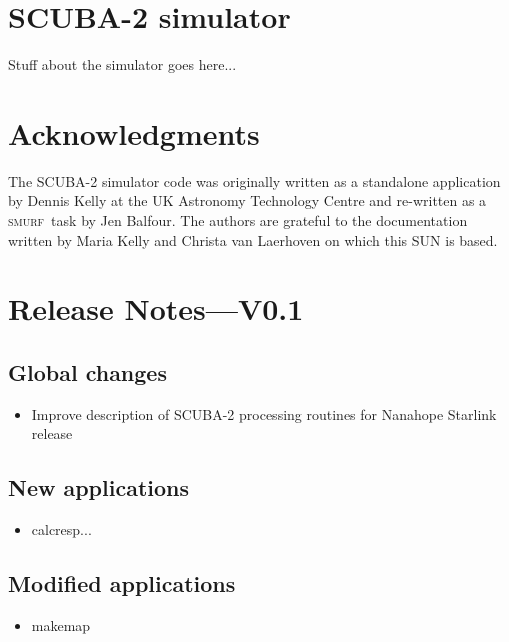 \documentclass[twoside,11pt]{article}
\newcommand{\xlabel}[1]{}
\renewcommand{\_}{\texttt{\symbol{95}}}
\newcommand{\SMURF}{\textsc{smurf}}
\begin{document}
\section{\xlabel{simulator}SCUBA-2 simulator\label{se:sc2sim}}

Stuff about the simulator goes here...

\section{Acknowledgments}

The SCUBA-2 simulator code was originally written as a standalone
application by Dennis Kelly at the UK Astronomy Technology Centre and
re-written as a \SMURF\ task by Jen Balfour. The authors are grateful
to the documentation written by Maria Kelly and Christa van Laerhoven
on which this SUN is based.


\section{Release Notes---V0.1}

\subsection{Global changes}
\begin{itemize}
  \item Improve description of SCUBA-2 processing routines for Nanahope Starlink release
\end{itemize}

\subsection{New applications}
\begin{itemize}
  \item calcresp...
\end{itemize}

\subsection{Modified applications}
\begin{itemize}
  \item makemap
\end{itemize}
\end{document}
